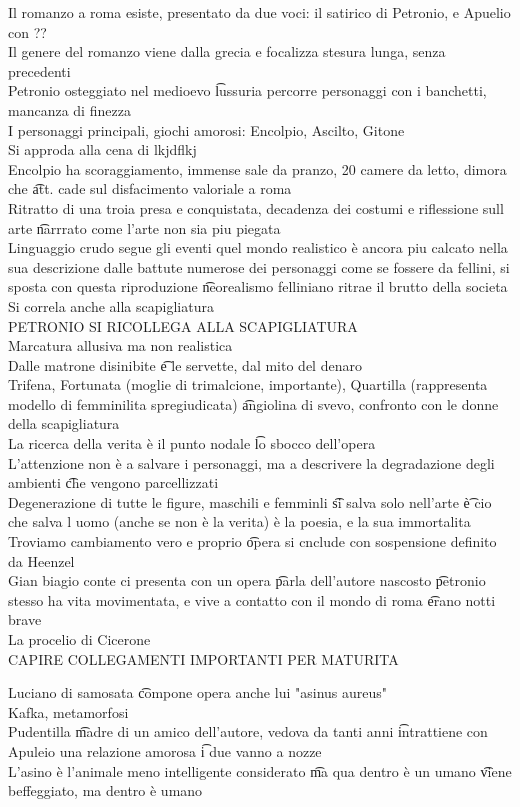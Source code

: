 \documentclass[12pt]{article}
\begin{document}
Il romanzo a roma esiste, presentato da due voci: il satirico di Petronio, e Apuelio con ?? \\
Il genere del romanzo viene dalla grecia e focalizza stesura lunga, senza precedenti \\
Petronio osteggiato nel medioevo \t lussuria percorre personaggi con i banchetti, mancanza di finezza \\
I personaggi principali, giochi amorosi: Encolpio, Ascilto, Gitone \\
Si approda alla cena di lkjdflkj \\
Encolpio ha scoraggiamento, immense sale da pranzo, 20 camere da letto, dimora che \t att. cade sul disfacimento valoriale a roma \\
Ritratto di una troia presa e conquistata, decadenza dei costumi e riflessione sull arte \t narrrato come l'arte non sia piu piegata \\
Linguaggio crudo segue gli eventi quel mondo realistico è ancora piu calcato nella sua descrizione dalle battute numerose dei personaggi come se fossere da fellini, si sposta con questa riproduzione \t neorealismo felliniano ritrae il brutto della societa \\
Si correla anche alla scapigliatura \\
PETRONIO SI RICOLLEGA ALLA SCAPIGLIATURA \\
Marcatura allusiva ma non realistica \\
Dalle matrone disinibite \t e le servette, dal mito del denaro \\
Trifena, Fortunata (moglie di trimalcione, importante), Quartilla (rappresenta modello di femminilita spregiudicata) \t angiolina di svevo, confronto con le donne della scapigliatura \\
La ricerca della verita è il punto nodale \t lo sbocco dell'opera \\
L'attenzione non è a salvare i personaggi, ma a descrivere la degradazione degli ambienti \t che vengono parcellizzati \\
Degenerazione di tutte le figure, maschili e femminli \t si salva solo nell'arte \t è cio che salva l uomo (anche se non è la verita) è la poesia, e la sua immortalita \\
Troviamo cambiamento vero e proprio \t opera si cnclude con sospensione definito da Heenzel \\
Gian biagio conte ci presenta con un opera \t parla dell'autore nascosto \t petronio stesso ha vita movimentata, e vive a contatto con il mondo di roma \t erano notti brave \\
La procelio di Cicerone \\
CAPIRE COLLEGAMENTI IMPORTANTI PER MATURITA

Luciano di samosata \t compone opera anche lui "asinus aureus" \\
Kafka, metamorfosi \\
Pudentilla \t madre di un amico dell'autore, vedova da tanti anni \t intrattiene con Apuleio una relazione amorosa \t i due vanno a nozze \\
L'asino è l'animale meno intelligente considerato \t ma qua dentro è un umano \t viene beffeggiato, ma dentro è umano
\end{document}
